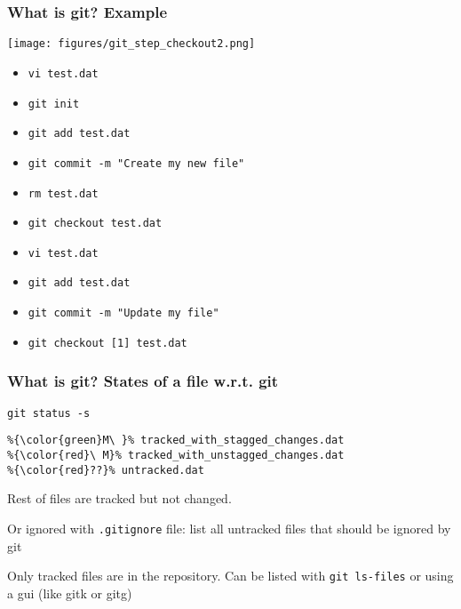\documentclass[xcolor=dvipsnames,10pt]{beamer}
\begin{document}
\addtocounter{framenumber}{-1}
\begin{frame}
 \frametitle{What is git? Example}
 
 \begin{center}
  \texttt{[image: figures/git\_step\_checkout2.png]}
 \end{center}
 \vspace*{-0.5cm}
 
 \begin{itemize}
  \color{gray}
  \item[] \texttt{vi test.dat}
  \item[] \texttt{git init}
  \item[] \texttt{git add test.dat}
  \item[] \texttt{git commit -m "Create my new file"}
  \item[] \texttt{rm test.dat}
  \item[] \texttt{git checkout test.dat}
  \item[] \texttt{vi test.dat}
  \item[] \texttt{git add test.dat}
  \item[] \texttt{git commit -m "Update my file"}
  \color{black}
  \item   \texttt{git checkout [1] test.dat}
  \color{white}
 \end{itemize}

\end{frame}

\begin{frame}[fragile]
 \frametitle{What is git? States of a file w.r.t. git}
 
 \texttt{git status -s}
 
 \begin{lstlisting}[style=Output]
%{\color{green}A\ }% stagged_first_time.dat
%{\color{green}M\ }% tracked_with_stagged_changes.dat 
%{\color{red}\ M}% tracked_with_unstagged_changes.dat 
%{\color{red}??}% untracked.dat
\end{lstlisting}
\vspace*{0.3cm}

Rest of files are tracked but not changed. 
\vspace*{0.2cm}

Or ignored with \texttt{.gitignore} file: list all untracked files that should be ignored by git
\vspace*{0.6cm}

Only tracked files are in the repository. Can be listed with \texttt{git ls-files} or using a gui (like gitk or gitg)
 
\end{frame}
\end{document}
